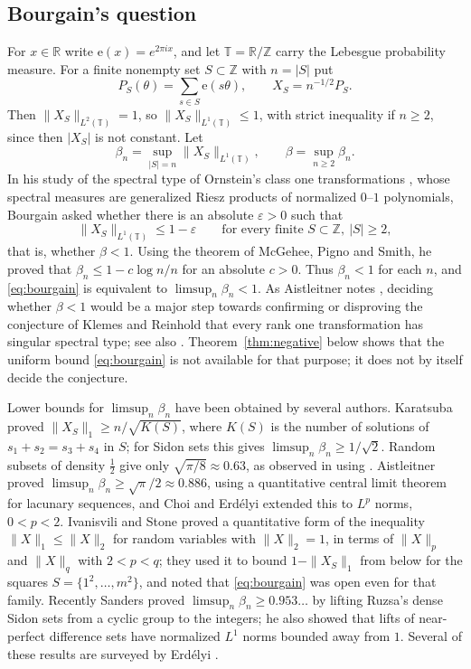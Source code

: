 \documentclass[11pt,reqno]{amsart}
\theoremstyle{definition}
\newcommand{\T}{\mathbb{T}}
\newcommand{\Z}{\mathbb{Z}}
\newcommand{\R}{\mathbb{R}}
\newcommand{\e}{\mathrm{e}}
\begin{document}
\subsection{Bourgain's question}
For $x\in\R$ write $\e(x)=e^{2\pi ix}$, and let $\T=\R/\Z$ carry the Lebesgue probability measure. For a finite nonempty set $S\subset\Z$ with $n=|S|$ put
\[
P_S(\theta)=\sum_{s\in S}\e(s\theta),\qquad X_S=n^{-1/2}P_S .
\]
Then $\|X_S\|_{L^2(\T)}=1$, so $\|X_S\|_{L^1(\T)}\le1$, with strict inequality if $n\ge2$, since then $|X_S|$ is not constant. Let
\[
\beta_n=\sup_{|S|=n}\|X_S\|_{L^1(\T)},\qquad \beta=\sup_{n\ge2}\beta_n .
\]
In his study of the spectral type of Ornstein's class one transformations \cite{Orn72}, whose spectral measures are generalized Riesz products of normalized $0$--$1$ polynomials, Bourgain \cite{Bou93} asked whether there is an absolute $\varepsilon>0$ such that
\begin{equation}\label{eq:bourgain}
\|X_S\|_{L^1(\T)}\le1-\varepsilon\qquad\text{for every finite }S\subset\Z,\ |S|\ge2,
\end{equation}
that is, whether $\beta<1$. Using the theorem of McGehee, Pigno and Smith, he proved \cite[Proposition~2]{Bou93} that $\beta_n\le1-c\log n/n$ for an absolute $c>0$. Thus $\beta_n<1$ for each $n$, and \eqref{eq:bourgain} is equivalent to $\limsup_n\beta_n<1$. As Aistleitner notes \cite{Ais13}, deciding whether $\beta<1$ would be a major step towards confirming or disproving the conjecture of Klemes and Reinhold \cite{KR97} that every rank one transformation has singular spectral type; see also \cite{Kle96,AH12}. Theorem~\ref{thm:negative} below shows that the uniform bound \eqref{eq:bourgain} is not available for that purpose; it does not by itself decide the conjecture.

Lower bounds for $\limsup_n\beta_n$ have been obtained by several authors. Karatsuba \cite{Kar98} proved $\|X_S\|_1\ge n/\sqrt{K(S)}$, where $K(S)$ is the number of solutions of $s_1+s_2=s_3+s_4$ in $S$; for Sidon sets this gives $\limsup_n\beta_n\ge1/\sqrt2$. Random subsets of density $\frac12$ give only $\sqrt{\pi/8}\approx0.63$, as observed in \cite{CE15} using \cite{BL01}. Aistleitner \cite{Ais13} proved $\limsup_n\beta_n\ge\sqrt\pi/2\approx0.886$, using a quantitative central limit theorem for lacunary sequences, and Choi and Erd\'elyi \cite{CE15} extended this to $L^p$ norms, $0<p<2$. Ivanisvili and Stone \cite{IS24} proved a quantitative form of the inequality $\|X\|_1\le\|X\|_2$ for random variables with $\|X\|_2=1$, in terms of $\|X\|_p$ and $\|X\|_q$ with $2<p<q$; they used it to bound $1-\|X_S\|_1$ from below for the squares $S=\{1^2,\dots,m^2\}$, and noted that \eqref{eq:bourgain} was open even for that family. Recently Sanders \cite{San26} proved $\limsup_n\beta_n\ge0.953\ldots$ by lifting Ruzsa's dense Sidon sets from a cyclic group to the integers; he also showed that lifts of near-perfect difference sets have normalized $L^1$ norms bounded away from $1$. Several of these results are surveyed by Erd\'elyi \cite{Erd20}.
\end{document}
